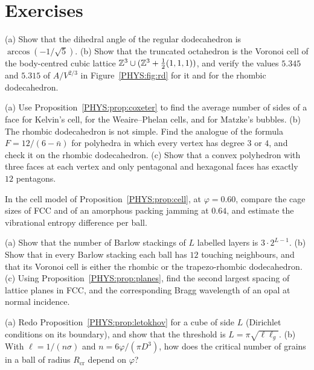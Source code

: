 \section*{Exercises}

\begin{exercise}
(a) Show that the dihedral angle of the regular dodecahedron is $\arccos(-1/\sqrt5)$. (b) Show that the
truncated octahedron is the Voronoi cell of the body-centred cubic lattice $\mathbb{Z}^3\cup(\mathbb{Z}^3+\frac12(1,1,1))$, and
verify the values $5.345$ and $5.315$ of $A/V^{2/3}$ in Figure~\ref{PHYS:fig:rd} for it and for the rhombic
dodecahedron.
\end{exercise}

\begin{exercise}
(a) Use Proposition~\ref{PHYS:prop:coxeter} to find the average number of sides of a face for Kelvin's cell, for
the Weaire--Phelan cells, and for Matzke's bubbles. (b) The rhombic dodecahedron is not simple. Find the
analogue of the formula $F=12/(6-\bar n)$ for polyhedra in which every vertex has degree $3$ or $4$, and check it
on the rhombic dodecahedron. (c) Show that a convex polyhedron with three faces at each vertex and only
pentagonal and hexagonal faces has exactly $12$ pentagons.
\end{exercise}

\begin{exercise}
In the cell model of Proposition~\ref{PHYS:prop:cell}, at $\varphi=0.60$, compare the cage sizes of FCC and of an amorphous packing jamming at $0.64$, and
estimate the vibrational entropy difference per ball.
\end{exercise}

\begin{exercise}
(a) Show that the number of Barlow stackings of $L$ labelled layers is $3\cdot2^{L-1}$. (b) Show that in every
Barlow stacking each ball has $12$ touching neighbours, and that its Voronoi cell is either the rhombic or the
trapezo-rhombic dodecahedron. (c) Using Proposition~\ref{PHYS:prop:planes}, find the second largest spacing of
lattice planes in FCC, and the corresponding Bragg wavelength of an opal at normal incidence.
\end{exercise}

\begin{exercise}
(a) Redo Proposition~\ref{PHYS:prop:letokhov} for a cube of side $L$ (Dirichlet conditions on its boundary),
and show that the threshold is $L=\pi\sqrt{\ell\ell_g}$.
(b) With $\ell=1/(n\sigma)$ and $n=6\varphi/(\pi D^3)$, how does the critical number of grains in a ball of
radius $R_{\mathrm{cr}}$ depend on $\varphi$?
\end{exercise}

